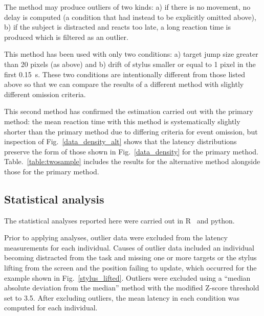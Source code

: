 \documentclass[10pt,letterpaper]{article}
\newcommand{\filename}[1]{\textsf{\textbf{#1}}}
\newcommand{\codeparam}[1]{\textsf{\textbf{#1}}}
\begin{document}
The method may produce outliers of two kinds: a) if there is no
movement, no delay is computed (a condition that had instead to be
explicitly omitted above), b) if the subject is distracted and reacts
too late, a long reaction time is produced which is filtered as an
outlier.

This method has been used with only two conditions: a) target
jump size greater than 20 pixels (as above) and b) drift of stylus
smaller or equal to 1 pixel in the first 0.15~s. These two conditions
are intentionally different from those listed above so that we can
compare the results of a different method with slightly different
omission criteria.

This second method has confirmed the estimation carried out with the
primary method: the mean reaction time with this method is
systematically slightly shorter than the primary method due to
differing criteria for event omission, but inspection of
Fig.~\ref{data_density_alt} shows that the latency distributions
preserve the form of those shown in Fig.~\ref{data_density} for the
primary method. Table.~\ref{table:twosample} includes the results for
the alternative method alongside those for the primary method.

\subsection*{Statistical analysis}

%
The statistical analyses reported here were carried out in
R~\cite{r_core_team_r:_2013} and python.

Prior to applying analyses, outlier data were excluded from the
latency measurements for each individual.
%
%
Causes of outlier data included an individual becoming distracted from
the task and missing one or more targets or the stylus lifting from
the screen and the position failing to update, which occurred for the
example shown in Fig.~\ref{stylus_lifted}. Outliers were excluded
using a ``median absolute deviation from the median'' method
\cite{boris_iglewicz_how_1993} with the modified Z-score threshold set
to 3.5. After excluding outliers, the mean latency in each condition
was computed for each individual.
\end{document}
